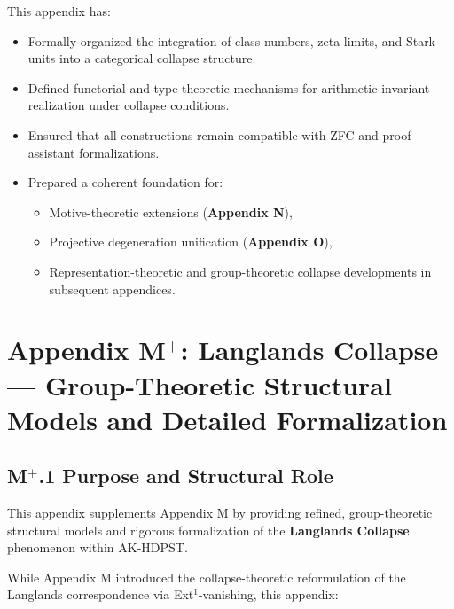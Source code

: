 \documentclass[11pt]{article}
\begin{document}
This appendix has:
\begin{itemize}
  \item Formally organized the integration of class numbers, zeta limits, and Stark units into a categorical collapse structure.
  \item Defined functorial and type-theoretic mechanisms for arithmetic invariant realization under collapse conditions.
  \item Ensured that all constructions remain compatible with ZFC and proof-assistant formalizations.
  \item Prepared a coherent foundation for:
  \begin{itemize}
    \item Motive-theoretic extensions (\textbf{Appendix N}),
    \item Projective degeneration unification (\textbf{Appendix O}),
    \item Representation-theoretic and group-theoretic collapse developments in subsequent appendices.
  \end{itemize}
\end{itemize}




\section*{Appendix M$^{+}$: Langlands Collapse — Group-Theoretic Structural Models and Detailed Formalization}

\subsection*{M$^{+}$.1 Purpose and Structural Role}

This appendix supplements Appendix M by providing refined, group-theoretic structural models and rigorous formalization of the \textbf{Langlands Collapse} phenomenon within AK-HDPST.

While Appendix M introduced the collapse-theoretic reformulation of the Langlands correspondence via Ext$^1$-vanishing, this appendix:
\end{document}

